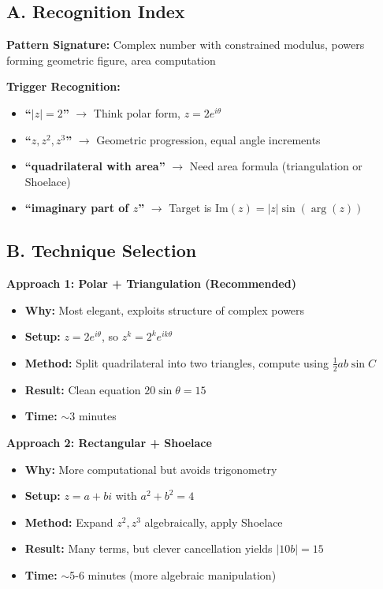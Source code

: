 \documentclass[12pt]{article}
\begin{document}
\begin{techniquesbox}
\subsection*{A. Recognition Index}

\textbf{Pattern Signature:} Complex number with constrained modulus, powers forming geometric figure, area computation

\textbf{Trigger Recognition:}
\begin{itemize}
    \item \textbf{``$|z| = 2$''} $\to$ Think polar form, $z = 2e^{i\theta}$
    \item \textbf{``$z, z^2, z^3$''} $\to$ Geometric progression, equal angle increments
    \item \textbf{``quadrilateral with area''} $\to$ Need area formula (triangulation or Shoelace)
    \item \textbf{``imaginary part of $z$''} $\to$ Target is $\text{Im}(z) = |z|\sin(\arg(z))$
\end{itemize}

\subsection*{B. Technique Selection}

\textbf{Approach 1: Polar + Triangulation (Recommended)}
\begin{itemize}
    \item \textbf{Why:} Most elegant, exploits structure of complex powers
    \item \textbf{Setup:} $z = 2e^{i\theta}$, so $z^k = 2^k e^{ik\theta}$
    \item \textbf{Method:} Split quadrilateral into two triangles, compute using $\frac{1}{2}ab\sin C$
    \item \textbf{Result:} Clean equation $20\sin\theta = 15$
    \item \textbf{Time:} $\sim$3 minutes
\end{itemize}

\textbf{Approach 2: Rectangular + Shoelace}
\begin{itemize}
    \item \textbf{Why:} More computational but avoids trigonometry
    \item \textbf{Setup:} $z = a + bi$ with $a^2 + b^2 = 4$
    \item \textbf{Method:} Expand $z^2, z^3$ algebraically, apply Shoelace
    \item \textbf{Result:} Many terms, but clever cancellation yields $|10b| = 15$
    \item \textbf{Time:} $\sim$5-6 minutes (more algebraic manipulation)
\end{itemize}


\end{techniquesbox}
\end{document}
